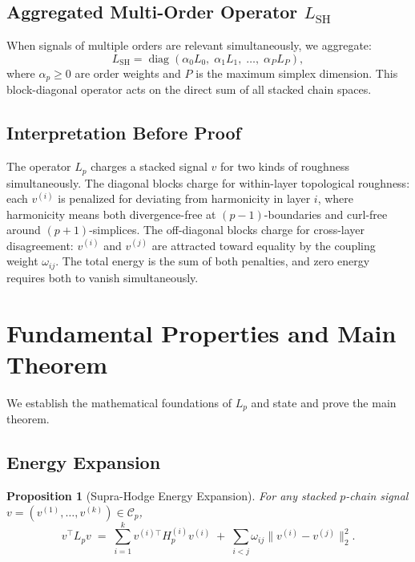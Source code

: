 \documentclass[11pt]{article}
\newtheorem{proposition}[theorem]{Proposition}
\theoremstyle{definition}
\theoremstyle{remark}
\newcommand{\LSH}{L_{\mathrm{SH}}}
\newcommand{\calC}{\mathcal{C}}
\DeclareMathOperator{\diag}{diag}
\begin{document}
\subsection{Aggregated Multi-Order Operator $L_{\mathrm{SH}}$}

When signals of multiple orders are relevant simultaneously, we aggregate:
\[
  \LSH = \diag(\alpha_0 L_0,\; \alpha_1 L_1,\; \dots,\; \alpha_P L_P),
\]
where $\alpha_p\geq 0$ are order weights and $P$ is the maximum simplex
dimension. This block-diagonal operator acts on the direct sum of all
stacked chain spaces.

\subsection{Interpretation Before Proof}

The operator $L_p$ charges a stacked signal $v$ for two kinds of roughness
simultaneously. The diagonal blocks charge for within-layer topological
roughness: each $v^{(i)}$ is penalized for deviating from harmonicity in layer
$i$, where harmonicity means both divergence-free at $(p-1)$-boundaries and
curl-free around $(p+1)$-simplices. The off-diagonal blocks charge for
cross-layer disagreement: $v^{(i)}$ and $v^{(j)}$ are attracted toward
equality by the coupling weight $\omega_{ij}$. The total energy is the sum of
both penalties, and zero energy requires both to vanish simultaneously.


\section{Fundamental Properties and Main Theorem}
\label{sec:properties}

We establish the mathematical foundations of $L_p$ and state and prove the
main theorem.

\subsection{Energy Expansion}

\begin{proposition}[Supra-Hodge Energy Expansion]
\label{prop:sh_energy}
For any stacked $p$-chain signal $v=(v^{(1)},\dots,v^{(k)})\in\calC_p$,
\[
  v^\top L_p v
  \;=\; \sum_{i=1}^k v^{(i)\top}H_p^{(i)}v^{(i)}
  \;+\; \sum_{i<j}\omega_{ij}\|v^{(i)}-v^{(j)}\|_2^2.
\]
\end{proposition}
\end{document}
